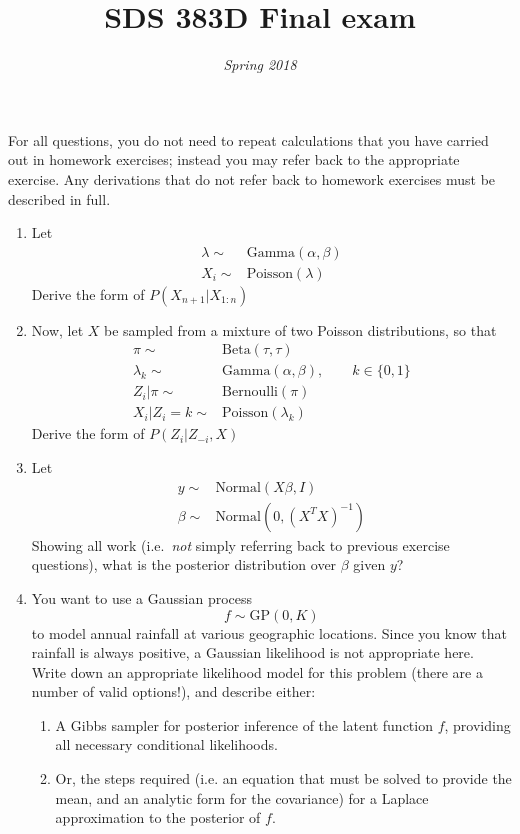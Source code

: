 \documentclass[12pt]{article}
\begin{document}
\title{\bf  SDS 383D Final exam}
\date{\it Spring 2018} %
\maketitle{}
For all questions, you do not need to repeat calculations that you have carried out in homework exercises; instead you may refer back to the appropriate exercise. Any derivations that do not refer back to homework exercises must be described in full. 
\begin{enumerate}
\item Let
  $$\begin{aligned}
  \lambda \sim& \mbox{Gamma}(\alpha,\beta) \\
  X_i \sim& \mbox{Poisson}(\lambda)
\end{aligned}$$
  Derive the form of $P(X_{n+1}|X_{1:n})$
\item Now, let $X$ be sampled from a mixture of two Poisson distributions, so that
  $$\begin{aligned}
  \pi \sim& \mbox{Beta}(\tau,\tau)\\
  \lambda_k \sim& \mbox{Gamma}(\alpha,\beta),\qquad k \in\{0,1\}\\
  Z_i|\pi \sim& \mbox{Bernoulli}(\pi)\\
  X_i|Z_i=k \sim& \mbox{Poisson}(\lambda_k)
\end{aligned}$$
  Derive the form of $P(Z_i|Z_{-i},X)$
\item Let
  $$\begin{aligned}
  y \sim& \mbox{Normal}(X\beta, I)\\
  \beta \sim& \mbox{Normal}(0,(X^TX)^{-1})
\end{aligned}$$
  Showing all work (i.e.\ \textit{not} simply referring back to previous exercise questions), what is the posterior distribution over $\beta$ given $y$?
\item You want to use a Gaussian process
  $$f\sim \mbox{GP}(0,K)$$
  to model annual rainfall at various geographic locations. Since you know that rainfall is always positive, a Gaussian likelihood is not appropriate here. Write down an appropriate likelihood model for this problem (there are a number of valid options!), and describe either:
  \begin{enumerate}
  \item A Gibbs sampler for posterior inference of the latent function $f$, providing all necessary conditional likelihoods.
  \item Or, the steps required (i.e. an equation that must be solved to provide the mean, and an analytic form for the covariance) for a Laplace approximation to the posterior of $f$.
  \end{enumerate}
\end{enumerate}
\end{document}
